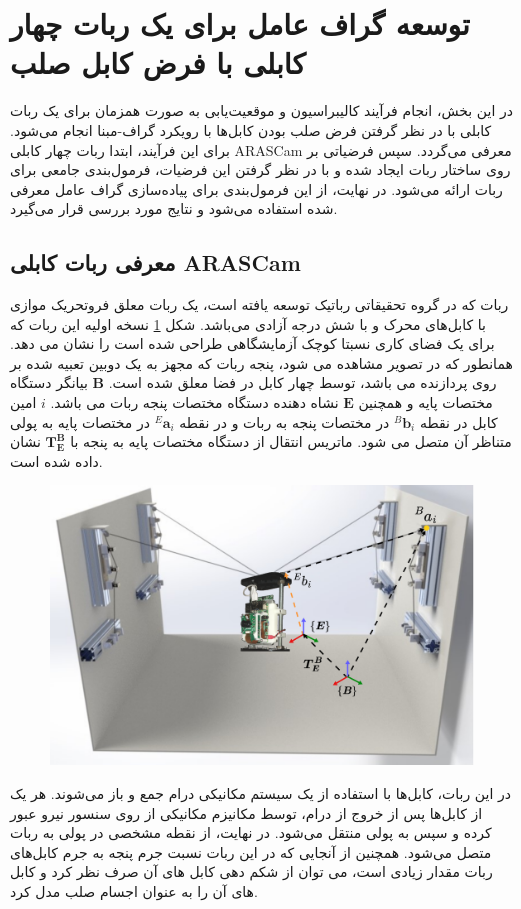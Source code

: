 \section{توسعه گراف عامل برای یک ربات چهار کابلی با فرض کابل صلب}
در این بخش، انجام فرآیند کالیبراسیون و موقعیت‌یابی به صورت همزمان برای یک ربات کابلی با در نظر گرفتن فرض صلب بودن کابل‌ها با رویکرد گراف-مبنا انجام می‌شود. برای این فرآیند، ابتدا ربات چهار کابلی ARASCam معرفی می‌گردد. سپس فرضیاتی بر روی ساختار ربات ایجاد شده و با در نظر گرفتن این فرضیات، فرمول‌بندی جامعی برای ربات ارائه می‌شود. در نهایت، از این فرمول‌بندی برای پیاده‌سازی گراف عامل معرفی شده استفاده می‌شود و نتایج مورد بررسی قرار می‌گیرد. 

\subsection{معرفی ربات کابلی ARASCam}
ربات  که در گروه تحقیقاتی رباتیک  توسعه یافته است، یک ربات معلق فروتحریک موازی با کابل‌های محرک و با شش درجه آزادی می‌باشد. شکل 
\ref{fig:arascam}
 نسخه اولیه این  ربات که برای یک فضای کاری نسبتا کوچک آزمایشگاهی طراحی شده است را نشان می دهد. همانطور که در تصویر مشاهده می شود، پنجه ربات که مجهز به یک دوبین تعبیه شده بر روی پردازنده 
می باشد، توسط چهار کابل در فضا معلق شده است. $\boldsymbol{B}$ بیانگر دستگاه مختصات پایه و همچنین $\boldsymbol{E}$ نشاه دهنده دستگاه مختصات پنجه ربات می باشد. $i$ امین کابل در نقطه ${}^B\!\boldsymbol{b}_i$ در مختصات پنجه به ربات و در نقطه ${}^E\!\boldsymbol{a}_i$ در مختصات پایه به پولی متناظر آن متصل می شود. ماتریس انتقال از دستگاه مختصات پایه به پنجه با 
$\boldsymbol{T}^{\boldsymbol{B}}_{\boldsymbol{E}}$
نشان داده شده است.
\begin{figure}
	\centering
	\includegraphics[width=0.7\linewidth]{img/arascam}
	\caption{}
	\label{fig:arascam}
\end{figure}

در این ربات، کابل‌ها با استفاده از یک سیستم مکانیکی درام جمع و باز می‌شوند. هر یک از کابل‌ها پس از خروج از درام، توسط مکانیزم مکانیکی از روی سنسور نیرو عبور کرده و سپس به پولی منتقل می‌شود. در نهایت، از نقطه مشخصی در پولی به ربات متصل می‌شود. همچنین از آنجایی که در این ربات نسبت جرم پنجه به جرم کابل‌های ربات مقدار زیادی است، می توان از شکم دهی کابل های آن صرف نظر کرد و کابل های آن را به عنوان اجسام صلب مدل کرد.

